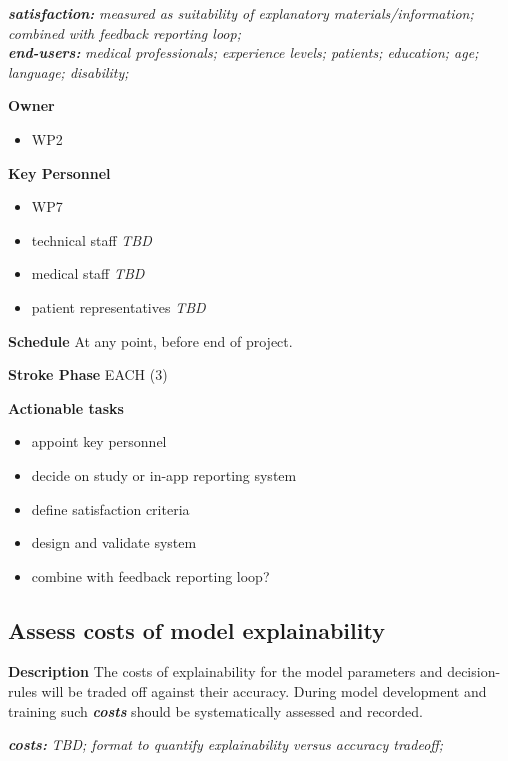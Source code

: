 \documentclass[
  letterpaper,
  DIV=11,
  numbers=noendperiod]{scrreport}
\providecommand{\tightlist}{%
  \setlength{\itemsep}{0pt}\setlength{\parskip}{0pt}}\usepackage{longtable,booktabs,array}
\begin{document}
\textbf{\emph{satisfaction:}} \emph{measured as suitability of
explanatory materials/information; combined with feedback reporting
loop;}\\
\textbf{\emph{end-users:}} \emph{medical professionals; experience
levels; patients; education; age; language; disability;}

\textbf{Owner}

\begin{itemize}
\tightlist
\item
  WP2
\end{itemize}

\textbf{Key Personnel}

\begin{itemize}
\tightlist
\item
  WP7
\item
  technical staff \emph{TBD}
\item
  medical staff \emph{TBD}
\item
  patient representatives \emph{TBD}
\end{itemize}

\textbf{Schedule} At any point, before end of project.

\textbf{Stroke Phase} EACH (3)

\textbf{Actionable tasks}

\begin{itemize}
\tightlist
\item
  appoint key personnel
\item
  decide on study or in-app reporting system
\item
  define satisfaction criteria
\item
  design and validate system
\item
  combine with feedback reporting loop?
\end{itemize}

\hypertarget{assess-costs-of-model-explainability}{%
\subsection{Assess costs of model
explainability}\label{assess-costs-of-model-explainability}}

\textbf{Description} The costs of explainability for the model
parameters and decision-rules will be traded off against their accuracy.
During model development and training such \textbf{\emph{costs}} should
be systematically assessed and recorded.

\textbf{\emph{costs:}} \emph{TBD; format to quantify explainability
versus accuracy tradeoff;}
\end{document}
